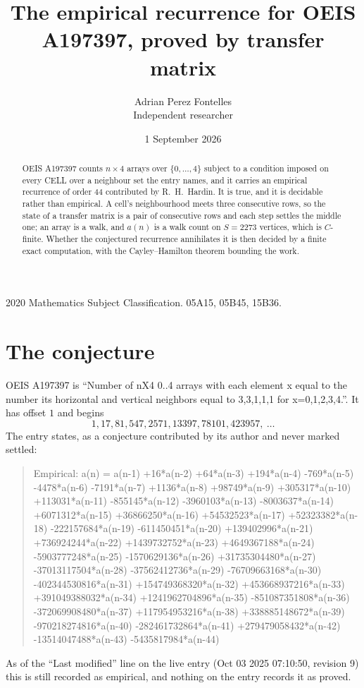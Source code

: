 \documentclass[11pt,a4paper]{article}
\title{The empirical recurrence for OEIS A197397, proved by transfer matrix}
\author{Adrian Perez Fontelles\\ \small Independent researcher}
\date{1 September 2026}
\theoremstyle{plain}
\theoremstyle{definition}
\begin{document}
\maketitle

\begin{abstract}
OEIS A197397 counts $n\times4$ arrays over $\{0,\dots,4\}$ subject to a condition imposed on
every CELL over a neighbour set the entry names, and it carries an empirical recurrence of
order $44$ contributed by R.~H.~Hardin. It is true, and it is decidable rather than
empirical. A cell's neighbourhood meets three consecutive rows, so the state of a transfer
matrix is a pair of consecutive rows and each step settles the middle one; an array is a
walk, and $a(n)$ is a walk count on $S=2273$ vertices, which is $C$-finite. Whether the
conjectured recurrence annihilates it is then decided by a finite exact computation, with the
Cayley--Hamilton theorem bounding the work.
\end{abstract}

\noindent\small 2020 Mathematics Subject Classification. 05A15, 05B45, 15B36.\normalsize

\section{The conjecture}

OEIS A197397 is ``Number of nX4 0..4 arrays with each element x equal to the number its horizontal and vertical neighbors equal to 3,3,1,1,1 for x=0,1,2,3,4.''. It has offset $1$ and begins
\[
1, 17, 81, 547, 2571, 13397, 78101, 423957,\ \dots
\]
The entry states, as a conjecture contributed by its author and never marked settled:
\begin{quote}
Empirical: a(n) = a(n-1) +16*a(n-2) +64*a(n-3) +194*a(n-4) -769*a(n-5) -4478*a(n-6) -7191*a(n-7) +1136*a(n-8) +98749*a(n-9) +305317*a(n-10) +113031*a(n-11) -855145*a(n-12) -3960103*a(n-13) -8003637*a(n-14) +6071312*a(n-15) +36866250*a(n-16) +54532523*a(n-17) +52323382*a(n-18) -222157684*a(n-19) -611450451*a(n-20) +139402996*a(n-21) +736924244*a(n-22) +1439732752*a(n-23) +4649367188*a(n-24) -5903777248*a(n-25) -1570629136*a(n-26) +31735304480*a(n-27) -37013117504*a(n-28) -37562412736*a(n-29) -76709663168*a(n-30) -402344530816*a(n-31) +154749368320*a(n-32) +453668937216*a(n-33) +391049388032*a(n-34) +1241962704896*a(n-35) -851087351808*a(n-36) -372069908480*a(n-37) +117954953216*a(n-38) +338885148672*a(n-39) -970218274816*a(n-40) -282461732864*a(n-41) +279479058432*a(n-42) -13514047488*a(n-43) -5435817984*a(n-44)
\end{quote}
As of the ``Last modified'' line on the live entry (Oct 03 2025 07:10:50, revision 9) this is still
recorded as empirical, and nothing on the entry records it as proved.
\end{document}
